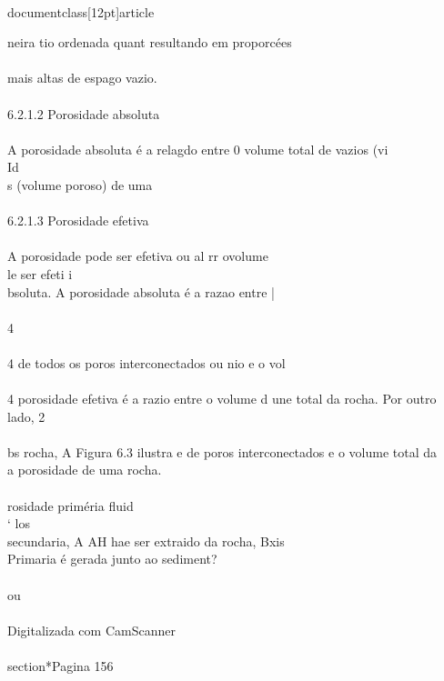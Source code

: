 \\documentclass[12pt]{article}
\begin{document}
neira tio ordenada quant resultando em proporcées\\
\\
mais altas de espago vazio.\\
\\
6.2.1.2  Porosidade absoluta\\
\\
A porosidade absoluta é a relagdo entre 0 volume total de vazios (vi\\
Id\\
s (volume poroso) de uma\\
\\
6.2.1.3 Porosidade efetiva\\
\\
A porosidade pode ser efetiva ou al rr ovolume\\
le ser efeti i\\
bsoluta. A porosidade absoluta é a razao entre |\\
\\
4\\
\\
4 de todos os poros interconectados ou nio e o vol\\
\\
4 porosidade efetiva é a razio entre o volume d une total da rocha. Por outro lado, 2\\
\\
bs rocha, A Figura 6.3 ilustra e de poros interconectados e o volume total da\\
a porosidade de uma rocha.\\
\\
rosidade priméria fluid\\
‘ los\\
secundaria, A AH hae ser extraido da rocha, Bxis\\
Primaria é gerada junto ao sediment?\\
\\
ou\\
\\
Digitalizada com CamScanner\\

\\section*{Pagina 156}
\end{document}
